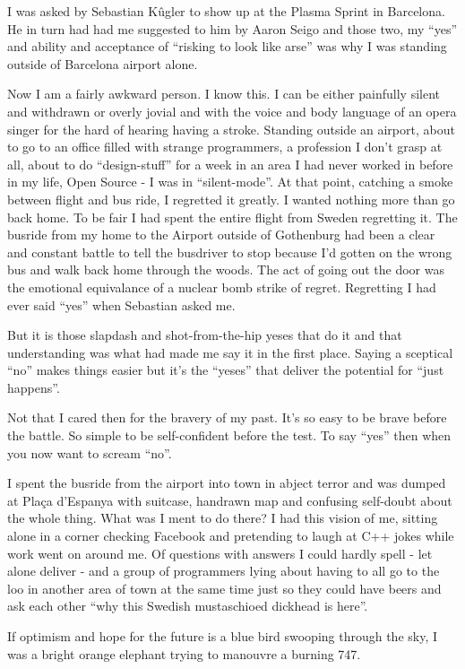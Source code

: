 I was asked by Sebastian Kûgler to show up at the Plasma Sprint in Barcelona. He in turn had had me suggested to him by Aaron Seigo and those two, my “yes” and ability and acceptance of “risking to look like arse” was why I was standing outside of Barcelona airport alone.

Now I am a fairly awkward person. I know this. I can be either painfully silent and withdrawn or overly jovial and with the voice and body language of an opera singer for the hard of hearing having a stroke. Standing outside an airport, about to go to an office filled with strange programmers, a profession I don’t grasp at all, about to do “design-stuff” for a week in an area I had never worked in before in my life, Open Source - I was in “silent-mode”. 
At that point, catching a smoke between flight and bus ride, I regretted it greatly. I wanted nothing more than go back home. To be fair I had spent the entire flight from Sweden regretting it. The busride from my home to the Airport outside of Gothenburg had been a clear and constant battle to tell the busdriver to stop because I’d gotten on the wrong bus and walk back home through the woods. The act of going out the door was the emotional equivalance of a nuclear bomb strike of regret. Regretting I had ever said “yes” when Sebastian asked me. 

But it is those slapdash and shot-from-the-hip yeses that do it and that understanding was what had made me say it in the first place. Saying a sceptical “no” makes things easier but it’s the “yeses” that deliver the potential for “just happens”.

Not that I cared then for the bravery of my past. It’s so easy to be brave before the battle. So simple to be self-confident before the test. To say “yes” then when you now want to scream “no”.

I spent the busride from the airport into town in abject terror and was dumped at Plaça d'Espanya with suitcase, handrawn map and confusing self-doubt about the whole thing.
What was I ment to do there? I had this vision of me, sitting alone in a corner checking Facebook and pretending to laugh at C++ jokes while work went on around me. Of questions with answers I could hardly spell - let alone deliver - and a group of programmers lying about having to all go to the loo in another area of town at the same time just so they could have beers and ask each other “why this Swedish mustaschioed dickhead is here”. 

If optimism and hope for the future is a blue bird swooping through the sky, I was a bright orange elephant trying to manouvre a burning 747.


